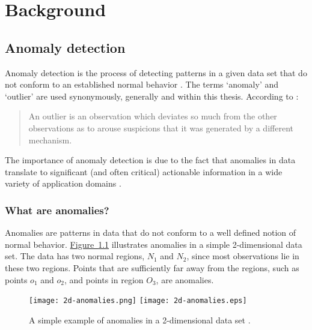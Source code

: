 \chapter{Background}
\label{ch:background}

\section{Anomaly detection}
\label{sec:anomalyDetection}
Anomaly detection is the process of detecting patterns in a given data set that 
do not conform to an established normal behavior \cite{Chandola:2007}. The terms
`anomaly' and `outlier' are used synonymously, generally and within this thesis.
According to \citeauthor{Hawkins:1980} \cite{Hawkins:1980}:

\begin{quote}
An outlier is an observation which deviates so much from the other observations 
as to arouse suspicions that it was generated by a different mechanism.
\end{quote}

The importance of anomaly detection is due to the fact that anomalies in data
translate to significant (and often critical) actionable information in a wide 
variety of application domains \cite{Chandola:2007}.

\subsection{What are anomalies?}
\label{sec:whatAreAnomalies}
Anomalies are patterns in data that do not conform to a well defined notion of
normal behavior. \hyperref[fig:2d-anomalies]{Figure~\ref{fig:2d-anomalies}} 
illustrates anomalies in a simple 2-dimensional data set. The data has two 
normal regions, $N_{1}$ and $N_{2}$, since most observations lie in these two 
regions. Points that are sufficiently far away from the regions, such as points 
$o_{1}$ and $o_{2}$, and points in region $O_{3}$, are anomalies.

\begin{figure}
\centering
\ifpdf
	\texttt{[image: 2d-anomalies.png]}
\else
	\texttt{[image: 2d-anomalies.eps]}
\fi
\caption{A simple example of anomalies in a 2-dimensional data set 
\cite{Chandola:2007}.}
\label{fig:2d-anomalies}
\end{figure}

